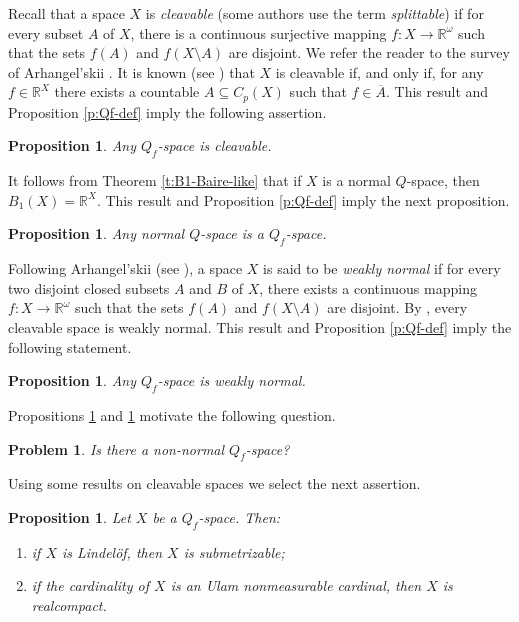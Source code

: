 \documentclass[preprint,11pt]{elsarticle}
\newtheorem{proposition}[theorem]{Proposition}
\newtheorem{problem}[theorem]{Problem}
\numberwithin{equation}{section}
\numberwithin{theorem}{section}
\newcommand{\w}{\omega}
\newcommand{\IR}{\mathbb{R}}
\newcommand{\SM}{{\setminus}}
\begin{document}
Recall that a space $X$ is {\em cleavable} (some authors use the term {\em splittable}) if for every subset $A$ of $X$, there is a continuous surjective mapping $f:X\to\IR^\w$ such that the sets $f(A)$ and $f(X\SM A)$ are disjoint. We refer the reader to the survey of Arhangel'skii \cite{Arh1993}.
It is known (see \cite[Theorem~3.5]{Arh1993}) that $X$ is cleavable if, and only if, for any $f \in \IR^X$ there exists a countable $A \subseteq C_p(X)$ such that $f \in \overline{A}$.
This result and Proposition \ref{p:Qf-def} imply the following assertion.

\begin{proposition}\label{p:cleavable}
Any $Q_f$-space is cleavable.
\end{proposition}

It follows from Theorem \ref{t:B1-Baire-like} that if $X$ is a normal $Q$-space, then $B_1(X)=\IR^X$. This result and Proposition \ref{p:Qf-def} imply the next proposition.

\begin{proposition}\label{p:nQ-Qf}
Any normal $Q$-space is a $Q_f$-space.
\end{proposition}

Following  Arhangel'skii (see \cite{Arh1993}), a space $X$ is said to be {\em weakly normal} if for every two disjoint closed subsets $A$ and $B$ of $X$, there exists a continuous mapping $f:X\to\IR^\w$ such that the sets $f(A)$ and $f(X\SM A)$ are disjoint. By \cite[Theorem~3.6]{Arh1993}, every cleavable space is weakly normal.
This result and Proposition \ref{p:Qf-def} imply the following statement.

\begin{proposition}\label{p:nQ-wn}
Any $Q_f$-space is weakly normal.
\end{proposition}

Propositions \ref{p:nQ-Qf} and \ref{p:nQ-wn} motivate the following question.

\begin{problem}
Is there a non-normal $Q_f$-space?
\end{problem}

Using some results on cleavable spaces we select the next assertion.

\begin{proposition}\label{p:B1-cleavable}
Let $X$ be a $Q_f$-space. Then:
\begin{enumerate}
\item[{\rm(i)}] if $X$ is Lindel\"{o}f, then $X$ is submetrizable;
\item[{\rm(ii)}] if the cardinality of $X$ is an Ulam nonmeasurable cardinal, then $X$ is realcompact.
\end{enumerate}
\end{proposition}
\end{document}
